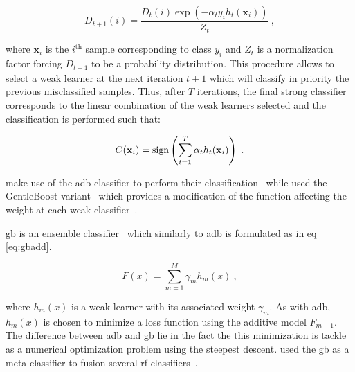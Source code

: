 \begin{enumerate}[leftmargin=*]
  \begin{equation}
    D_{t+1}(i) = \frac{ D_t(i) \exp \left( -\alpha_t y_i h_{t}(\mathbf{x}_{i} ) \right) }{ Z_t  } \ ,
    \label{eq:rewada}
  \end{equation}

  \noindent where $\mathbf{x}_i$ is the $i^{\text{th}}$ sample corresponding to
  class $y_i$ and $Z_t$ is a normalization factor forcing $D_{t+1}$ to be a
  probability distribution.
  This procedure allows to select a weak learner at the next iteration $t+1$
  which will classify in priority the previous misclassified samples.
  Thus, after $T$ iterations, the final strong classifier corresponds to the
  linear combination of the weak learners selected and the classification is
  performed such that:

  \begin{equation}
    C(\mathbf{x}_i) = \operatorname*{sign} \left( \sum_{t=1}^{T} \alpha_t h_t(\mathbf{x}_i) \right) \ .
    \label{eq:strclaada}
  \end{equation}

  \citeauthor{Lopes2011} make use of the \ac{adb} classifier to perform their
  classification~\cite{Lopes2011} while \citeauthor{Litjens2014} used the
  GentleBoost variant~\cite{Friedman1998} which provides a modification of the
  function affecting the weight at each weak classifier~\cite{Litjens2014}.

  \ac{gb} is an ensemble classifier~\cite{friedman2001greedy} which similarly
  to \ac{adb} is formulated as in \acs{eq}\,\eqref{eq:gbadd}.

  \begin{equation}
    F(x) = \sum_{m=1}^{M} \gamma_{m} h_m(x) \ ,
    \label{eq:gbadd}
  \end{equation}

  \noindent where $h_m(x)$ is a weak learner with its associated weight
  $\gamma_m$.
  As with \ac{adb}, $h_m(x)$ is chosen to minimize a loss function using the
  additive model $F_{m-1}$.
  The difference between \ac{adb} and \ac{gb} lie in the fact the this
  minimization is tackle as a numerical optimization problem using the steepest
  descent.
  \citeauthor{Lemaitre2016thesis} used the \ac{gb} as a meta-classifier to
  fusion several \ac{rf} classifiers~\cite{Lemaitre2016thesis}.


\end{enumerate}
